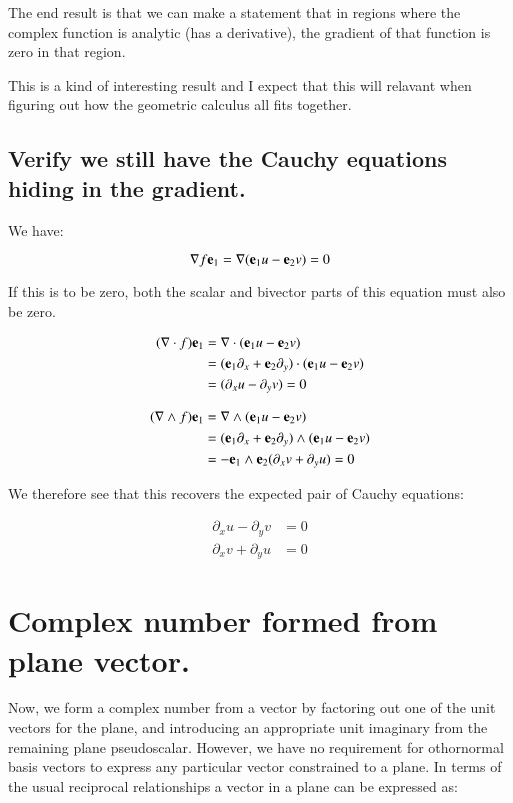\documentclass{article}
\newcommand{\grad}[0]{\nabla}
\begin{document}
The end result is that we can make a statement that
in regions where the complex function is analytic (has a derivative), the gradient of that function is zero in that region.

This is a kind of interesting result and I expect that this will relavant when figuring out how the geometric calculus
all fits together.

\subsection{ Verify we still have the Cauchy equations hiding in the gradient. }

We have:

\begin{equation*}
\grad f \Be_1 = \grad ( \Be_1 u - \Be_2 v) = 0
\end{equation*}

If this is to be zero, both the scalar and bivector parts of this equation must also be zero.

\begin{align*}
(\grad \cdot f) \Be_1
&= \grad \cdot ( \Be_1 u - \Be_2 v) \\
&= (\Be_1 \partial_x + \Be_2 \partial_y) \cdot ( \Be_1 u - \Be_2 v) \\
&= (\partial_x u - \partial_y v) = 0
\end{align*}

\begin{align*}
(\grad \wedge f) \Be_1
&= \grad \wedge ( \Be_1 u - \Be_2 v) \\
&= (\Be_1 \partial_x + \Be_2 \partial_y) \wedge ( \Be_1 u - \Be_2 v) \\
&= -\Be_1 \wedge \Be_2 (\partial_x v + \partial_y u) = 0
\end{align*}

We therefore see that this recovers the expected pair of Cauchy equations:

\begin{align*}
\partial_x u - \partial_y v &= 0 \\
\partial_x v + \partial_y u &= 0
\end{align*}

\section{ Complex number formed from plane vector. }

Now, we form a complex number from a vector by factoring out one of the unit vectors for the plane, and introducing an
appropriate unit imaginary from the remaining plane pseudoscalar.
However, we have no requirement for othornormal basis vectors to
express any particular vector constrained to a plane.  In terms of the usual reciprocal relationships a vector in a plane can be expressed as:
\end{document}
